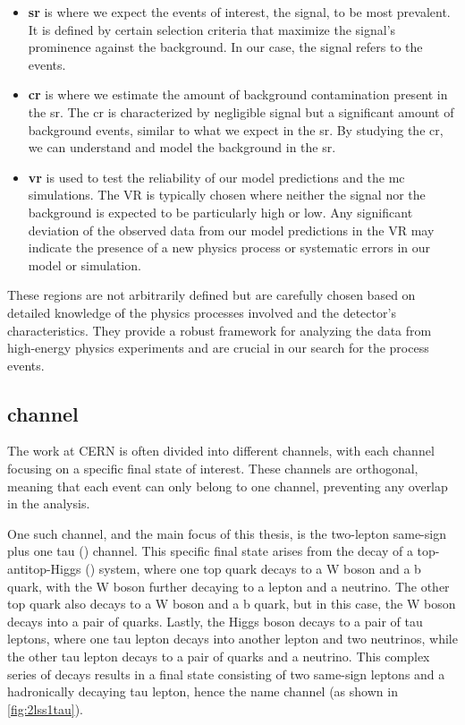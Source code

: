 \begin{itemize}
    \item \textbf{\gls{sr}} is where we expect the events of interest, the
          signal, to be most prevalent. It is defined by certain selection criteria that maximize the signal's prominence against
          the background. In our case, the signal refers to the \tth events.

    \item \textbf{\gls{cr}} is where we estimate the amount of background contamination
          present in the \gls{sr}. The \gls{cr} is characterized by negligible signal but a significant amount of background
          events, similar to what we expect in the \gls{sr}. By studying the \gls{cr}, we can understand and model the background in the \gls{sr}.

    \item \textbf{\gls{vr}} is used to test the reliability of our model predictions
          and the \gls{mc} simulations. The VR is typically chosen where neither the signal nor the background is expected to
          be particularly high or low. Any significant deviation of the observed data from our model predictions in the VR may
          indicate the presence of a new physics process or systematic errors in our model or simulation.
\end{itemize}

These regions are not arbitrarily defined but are carefully chosen based on detailed knowledge of the physics processes
involved and the detector's characteristics. They provide a robust framework for analyzing the data from high-energy
physics experiments and are crucial in our search for the \tth process events.

\subsection{\lss channel}
\label{sec:lss}



The work at CERN is often divided into different channels, with each channel focusing on a specific final state of
interest. These channels are orthogonal, meaning that each event can only belong to one channel, preventing any overlap
in the analysis.

One such channel, and the main focus of this thesis, is the two-lepton same-sign plus one tau (\lss) channel. This
specific final state arises from the decay of a top-antitop-Higgs (\tth) system, where one top quark decays to a W boson
and a b quark, with the W boson further decaying to a lepton and a neutrino. The other top quark also decays to a W
boson and a b quark, but in this case, the W boson decays into a pair of quarks. Lastly, the Higgs boson decays to a
pair of tau leptons, where one tau lepton decays into another lepton and two neutrinos, while the other tau lepton
decays to a pair of quarks and a neutrino. This complex series of decays results in a final state consisting of two
same-sign leptons and a hadronically decaying tau lepton, hence the name \lss channel (as shown in \autoref{fig:2lss1tau}).

